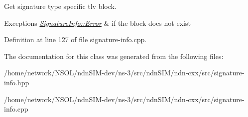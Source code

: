 Get signature type specific tlv block. 


\begin{DoxyExceptions}{Exceptions}
{\em \hyperlink{classndn_1_1SignatureInfo_1_1Error}{Signature\+Info\+::\+Error}} & if the block does not exist \\
\hline
\end{DoxyExceptions}


Definition at line 127 of file signature-\/info.\+cpp.



The documentation for this class was generated from the following files\+:\begin{DoxyCompactItemize}
\item 
/home/network/\+N\+S\+O\+L/ndn\+S\+I\+M-\/dev/ns-\/3/src/ndn\+S\+I\+M/ndn-\/cxx/src/signature-\/info.\+hpp\item 
/home/network/\+N\+S\+O\+L/ndn\+S\+I\+M-\/dev/ns-\/3/src/ndn\+S\+I\+M/ndn-\/cxx/src/signature-\/info.\+cpp\end{DoxyCompactItemize}
